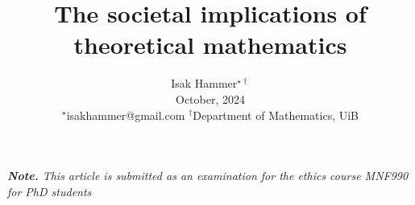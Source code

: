 \documentclass[10pt,twocolumn]{article}
\title{ {\Large \textbf{The societal implications of theoretical mathematics   }} }
\begin{document}
\author{
Isak Hammer$^{\star\dagger}$  \\
{\small  October, 2024}\\
{\footnotesize $^\star$isakhammer@gmail.com }
{\footnotesize $^\dagger$Department of Mathematics, UiB}\\
}

\maketitle
\begin{sloppy}
 \textit{ \textbf{Note.} This article is submitted as an examination for the ethics course MNF990 for PhD students    \\}






\end{sloppy}
\end{document}
